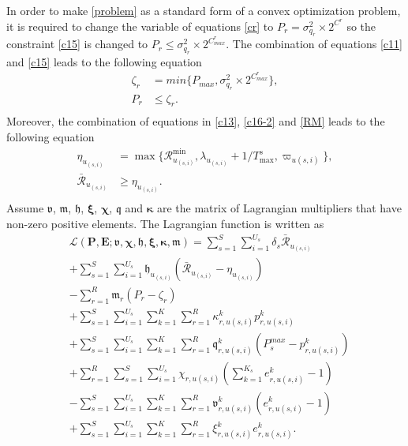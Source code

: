 \documentclass[conference]{IEEEtran}
\begin{document}
In order to make \eqref{problem} as a standard form of a convex optimization problem, it is required to change the variable of equations \eqref{cr} to $P_r = \sigma_{q_r}^2\times 2^{C^r}$ so the constraint 
\eqref{c15} is changed to
 $P_r \leq \sigma_{q_r}^2\times 2^{C^r_{max}}$.
The combination of equations \eqref{c11} and \eqref{c15} leads to the following equation
\begin{equation} \label{pr11}
\begin{split}
\zeta_{r}&= min\{P_{max}, \sigma_{q_r}^2\times 2^{C^r_{max}} \}, \\
P_r &\leq  \zeta_{r}.\\
\end{split}
\end{equation} 
Moreover, the combination of equations in \eqref{c13}, \eqref{c16-2} and \eqref{RM} leads to the following equation
\begin{equation}\label{RConstr}
\begin{split}
\eta_{u_{(s,i)}}&= \max\{\mathcal{R}_{u_{(s,i)}}^{\min}, \lambda_{u_{(s,i)}}+1/T^s_{\max}, \varpi_{u(s,i)} \}, \\
\mathcal{\bar{R}}_{u_{(s,i)}} &\geq  \eta_{u_{(s,i)}}.\\
\end{split}
\end{equation}
Assume $\boldsymbol{\mathfrak{v}}$, $\boldsymbol{\mathfrak{m}}$, $\boldsymbol{\mathfrak{h}}$, $\boldsymbol{\xi}$, $\boldsymbol{\chi}$, $\boldsymbol{\mathfrak{q}}$ and $\boldsymbol{ \kappa}$ are the matrix of Lagrangian multipliers that have non-zero positive elements. The Lagrangian function is written as 
\begin{subequations}\label{lagrang}
\begin{alignat}{4}
&\mathcal{L}(\boldsymbol{P},\boldsymbol{E}; \boldsymbol{\mathfrak{v}}, \boldsymbol{\chi}, \boldsymbol{\mathfrak{h}}, \boldsymbol{ \xi}, \boldsymbol{ \kappa}, \boldsymbol{\mathfrak{m}})  = \sum\limits_{s=1}^{S} \sum\limits_{i=1}^{U_s}\delta_s\mathcal{\bar{R}}_{u_{(s,i)}}\\
&+\sum\limits_{s=1}^{S} \sum\limits_{i=1}^{U_s}\mathfrak{h}_{u_{(s,i)}} (\mathcal{\bar{R}}_{u_{(s,i)}}-\eta_{u_{(s,i)}})\\
&-  \sum\limits_{r=1}^{R} \mathfrak{m}_{r} (P_{r}- \zeta_r)\\
&+  \sum\limits_{s=1}^{S} \sum\limits_{i=1}^{U_s}\sum\limits_{k=1}^{K} \sum\limits_{r=1}^{R}\kappa^k_{r,u(s,i)}  p^k_{r,u(s,i)}\\
&+  \sum\limits_{s=1}^{S} \sum\limits_{i=1}^{U_s}\sum\limits_{k=1}^{K} \sum\limits_{r=1}^{R}\mathfrak{q}^k_{r,u(s,i)} (P^{max}_{s}- p^k_{r,u(s,i)})\\
&+ \sum\limits_{r=1}^{R}\sum\limits_{s=1}^{S} \sum\limits_{i=1}^{U_s}\chi_{r,u(s,i)}(\sum_{k =1}^{K_s} e^{k}_{r,u(s,i)} -1)\\
&-  \sum\limits_{s=1}^{S} \sum\limits_{i=1}^{U_s}\sum\limits_{k=1}^{K} \sum\limits_{r=1}^{R}\mathfrak{v}^{k}_{r,u(s,i)} (e^{k}_{r,u(s,i)} -1)\\
&+  \sum\limits_{s=1}^{S} \sum\limits_{i=1}^{U_s}\sum\limits_{k=1}^{K} \sum\limits_{r=1}^{R} \xi^{k}_{r,u(s,i)} e^{k}_{r,u(s,i)}.
\end{alignat}
\end{subequations}
\end{document}
